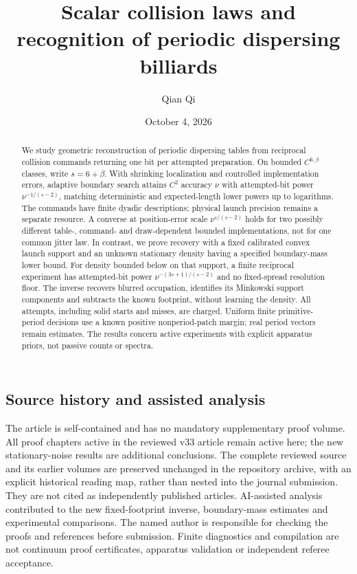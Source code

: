 \documentclass[11pt]{amsart}
\title[Scalar collision laws]{Scalar collision laws and recognition of periodic dispersing billiards}
\author{Qian Qi}
\date{October 4, 2026}
\theoremstyle{definition}\newtheorem{definition}[theorem]{Definition}
\theoremstyle{remark}\newtheorem{remark}[theorem]{Remark}
\numberwithin{equation}{section}
\begin{document}
\raggedbottom
\begin{abstract}
We study geometric reconstruction of periodic dispersing tables from
reciprocal collision commands returning one bit per attempted preparation.
On bounded $C^{6,\beta}$ classes, write $s=6+\beta$. With shrinking
localization and controlled implementation errors, adaptive boundary
search attains $C^2$ accuracy $\nu$ with attempted-bit power
$\nu^{-1/(s-2)}$, matching deterministic and expected-length lower
powers up to logarithms. The commands have finite dyadic descriptions;
physical launch precision remains a separate resource. A converse at
position-error scale $\nu^{s/(s-2)}$ holds for two possibly different
table-, command- and draw-dependent bounded implementations, not for
one common jitter law. In contrast, we prove recovery with a fixed
calibrated convex launch support and an unknown stationary density
having a specified boundary-mass lower bound. For density bounded below
on that support, a finite reciprocal experiment has attempted-bit power
$\nu^{-(3s+1)/(s-2)}$ and no fixed-spread resolution floor. The inverse
recovers blurred occupation, identifies its Minkowski support components
and subtracts the known footprint, without learning the density. All
attempts, including solid starts and misses, are charged. Uniform finite
primitive-period decisions use a known positive nonperiod-patch margin;
real period vectors remain estimates. The results concern active
experiments with explicit apparatus priors, not passive counts or spectra.
\end{abstract}
\maketitle












\subsection*{Source history and assisted analysis}
The article is self-contained and has no mandatory supplementary proof
volume. All proof chapters active in the reviewed v33 article remain
active here; the new stationary-noise results are additional conclusions.
The complete reviewed source and its earlier volumes are preserved
unchanged in the repository archive, with an explicit historical reading
map, rather than nested into the journal submission. They are not cited
as independently published articles. AI-assisted analysis contributed
to the new fixed-footprint inverse, boundary-mass estimates and experimental
comparisons. The named author is responsible for checking the proofs
and references before submission. Finite diagnostics and compilation
are not continuum proof certificates, apparatus validation or independent
referee acceptance.

\end{document}

